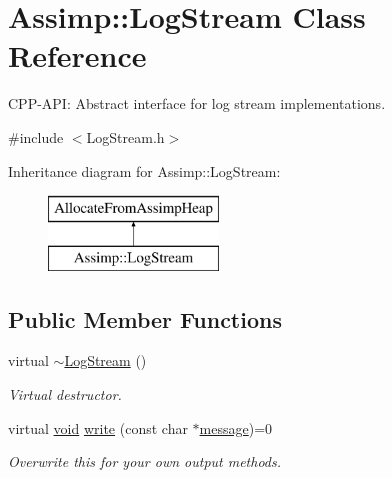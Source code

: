 \hypertarget{class_assimp_1_1_log_stream}{\section{Assimp\-:\-:Log\-Stream Class Reference}
\label{class_assimp_1_1_log_stream}
}


C\-P\-P-\/\-A\-P\-I\-: Abstract interface for log stream implementations.  




{\ttfamily \#include $<$Log\-Stream.\-h$>$}

Inheritance diagram for Assimp\-:\-:Log\-Stream\-:\begin{figure}[H]
\begin{center}
\leavevmode
\includegraphics[height=2.000000cm]{class_assimp_1_1_log_stream}
\end{center}
\end{figure}
\subsection*{Public Member Functions}
\begin{DoxyCompactItemize}
\item 
virtual \hyperlink{class_assimp_1_1_log_stream_a72cabcadc78dcbdd54b5641703057ee7}{$\sim$\-Log\-Stream} ()
\begin{DoxyCompactList}\small\item\em Virtual destructor. \end{DoxyCompactList}\item 
virtual \hyperlink{wglew_8h_aeea6e3dfae3acf232096f57d2d57f084}{void} \hyperlink{class_assimp_1_1_log_stream_ab0bfcb5ab9988ef65d7222a50f6e8d37}{write} (const char $\ast$\hyperlink{glew_8h_a76333d9470ffdd4811326932394d36da}{message})=0
\begin{DoxyCompactList}\small\item\em Overwrite this for your own output methods. \end{DoxyCompactList}\end{DoxyCompactItemize}
